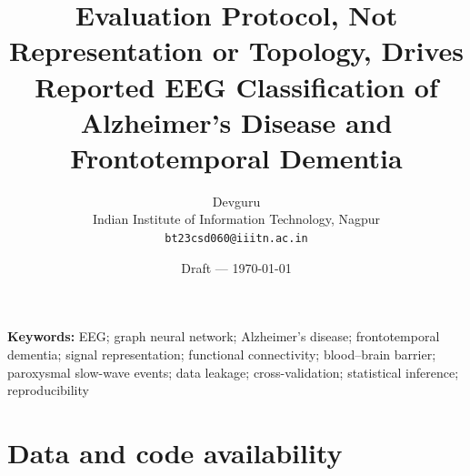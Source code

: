 \documentclass[11pt]{article}
\title{Evaluation Protocol, Not Representation or Topology, Drives Reported EEG Classification of
Alzheimer's Disease and Frontotemporal Dementia}
\author{Devguru\\ Indian Institute of Information Technology, Nagpur\\ \texttt{bt23csd060@iiitn.ac.in}}
\date{Draft --- \today}
\begin{document}
\maketitle

\begin{abstract}

\end{abstract}

\noindent\textbf{Keywords:} EEG; graph neural network; Alzheimer's disease; frontotemporal dementia;
signal representation; functional connectivity; blood--brain barrier; paroxysmal slow-wave events;
data leakage; cross-validation; statistical inference; reproducibility








\section*{Data and code availability}







\clearpage

\end{document}
